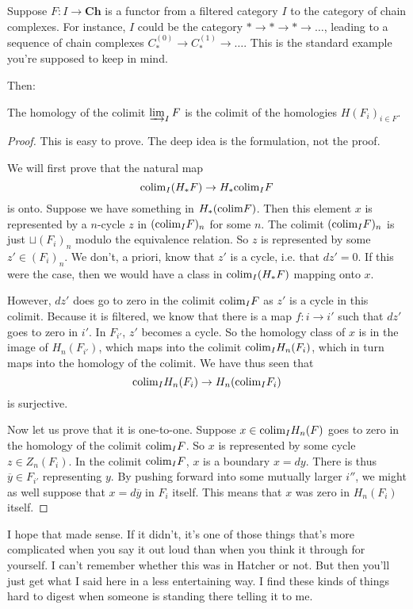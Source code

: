 Suppose $F: I \to \mathbf{Ch}$ is a functor from a filtered category $I$ to the
category of chain complexes. For instance, $I$ could be the category $\ast \to
\ast \to \ast \to \dots$, leading to  a sequence of chain complexes
$C_*^{(0)}\to C_{*}^{(1)} \to \dots$.  This is the standard example you're
supposed to keep in mind. 

Then:
\begin{proposition} 
The homology of the colimit $\varinjlim_I F$ is the colimit of the homologies
$H(F_i)_{i \in F}$.
\end{proposition} 

\begin{proof} 
This is easy to prove. The deep idea is the formulation, not the proof. 

We will first prove that the  natural map
\[ \mathrm{colim}_I (H_*F) \to H_* \mathrm{colim}_I F   \]
is onto. Suppose we have something in $H_*(\mathrm{colim} F)$. Then this element $x$ is
represented by a $n$-cycle $z$ in $(\mathrm{colim}_I F)_n$ for some $n$. The colimit
$(\mathrm{colim}_I F)_n$ is just $\sqcup (F_i)_n$ modulo the equivalence relation. 
So $z$ is represented by some $z' \in (F_i)_n$. We don't, a priori, know that
$z'$ is a cycle, i.e. that $dz' = 0$. If this were the case, then we would have
a class in $\mathrm{colim}_I (H_* F)$ mapping onto $x$.

However, $dz'$ does go to zero in the colimit $\mathrm{colim}_I F$ as $z'$ is a cycle
in this colimit. Because it is filtered, we know that there is a map $f:i \to
i'$ such that $dz'$ goes to zero in $i'$. 
In $F_{i'}$, $z'$ becomes a cycle.  So the homology class of $x$ is in the
image of $H_n(F_{i'})$, which maps into the colimit $\mathrm{colim}_I H_n(F_i)$, which
in turn maps into the homology of the colimit. We have thus seen that
\[ \mathrm{colim}_I H_n(F_i) \to H_n(\mathrm{colim}_I F_i)  \]
is surjective. 

Now let us prove that it is one-to-one. Suppose $x \in \mathrm{colim}_I H_n(F)$ 
goes to zero in the homology of the colimit $\mathrm{colim}_I F$. So $x$ is represented
by some cycle $z \in Z_n(F_i)$.  In the colimit $\mathrm{colim}_I F$, $x$ is a
boundary $x = dy$. There is thus $\overline{y} \in F_{i'}$ representing $y$. 
By pushing forward into some mutually larger $i''$, we might as well suppose that $x = d
\overline{y}$ in
$F_i$ itself. This means that $x$ was zero in $H_n(F_i)$ itself.
\end{proof} 

I hope that made sense. If it didn't, it's one of those things that's more
complicated when you say it out loud than when you think it through for
yourself. I can't remember whether this was in Hatcher or not.
But then you'll just get what I said here in a less entertaining way. I find
these kinds of things hard to digest when someone is standing there telling it
to me. 

